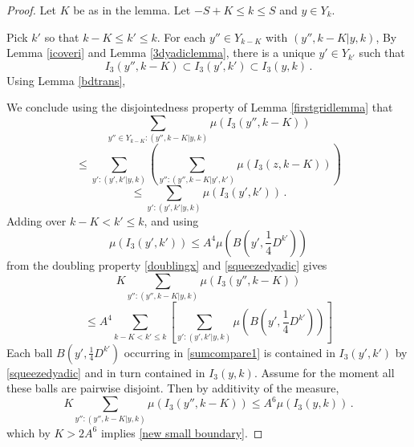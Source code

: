 \begin{proof}
Let $K$ be as in the lemma. Let $-S+K\le k\le S$ and $y\in Y_k$.

Pick $k'$ so that $k-K\le k'\le k$.
For each $y''\in Y_{k-K}$ with $(y'',k-K| y,k)$,
By Lemma \ref{icoveri} and Lemma \ref{3dyadiclemma}, there is a unique $y'\in Y_{k'}$ such that
\begin{equation}
    I_3(y'',k-K)\subset I_3(y',k')\subset I_3(y,k)\, .
\end{equation}
Using Lemma \ref{bdtrans}, 

We conclude using the disjointedness property of
Lemma \ref{firstgridlemma} that
\begin{equation}\label{scalecompare}
    \sum_{y''\in Y_{k-K}: (y'',k-K|y,k)}\mu(I_3(y'',k-K))
\end{equation}
\begin{equation}
    \le
\sum_{y': (y',k'|y,k)}\left(
    \sum_{y'': (y'',k-K|y',k')}\mu(I_3(z,k-K))\right)
\end{equation}
    \begin{equation}
    \le
\sum_{y': (y',k'|y,k)}
\mu(I_3(y',k'))    \, .
    \end{equation}
Adding over $k-K<k'\le k$, and using
\[\mu(I_3(y',k'))\le A^4 \mu(B(y', \frac 14 D^{k'}))\]
from the doubling property \eqref{doublingx} and
\eqref{squeezedyadic} gives
\begin{equation}\label{sumcompare}
    K\sum_{y'': (y'',k-K|y,k)}
    \mu(I_3(y'',k-K))
\end{equation}
\begin{equation}\label{sumcompare1}
    \le A^4 \sum_{k-K<k'\le k}
    \left[ \sum_{y': (y',k'|y,k)}
\mu(B(y', \frac 14 D^{k'}))\right]
\end{equation}
Each ball $B(y', \frac 14 D^{k'})$ occurring in
\eqref{sumcompare1} is contained in $I_3(y',k')$
by \eqref{squeezedyadic} and in turn contained in
$I_3(y,k)$. Assume for the moment all these balls are pairwise disjoint. Then
by additivity of the measure,
\begin{equation}
    K\sum_{y'': (y'',k-K|y,k)}
    \mu(I_3(y'',k-K))
    \le A^6
\mu(I_3(y,k))\, .
\end{equation}
which by $K>2A^6$ implies \eqref{new small boundary}.


\end{proof}
